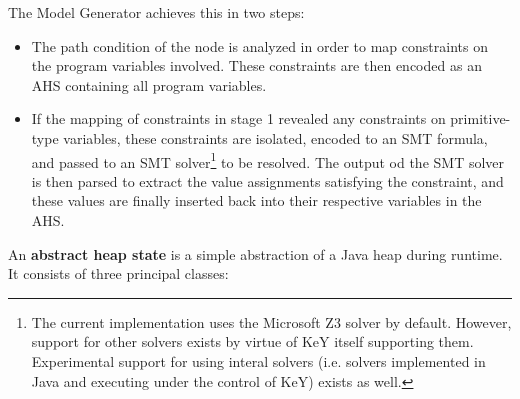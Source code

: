 \documentclass{article}
\newcommand{\tmstrong}[1]{\textbf{#1}}
\begin{document}
The Model Generator achieves this in two steps:
\begin{itemize}
  \item The path condition of the node is analyzed in order to map constraints
  on the program variables involved. These constraints are then encoded as an
  AHS containing all program variables.
  
  \item If the mapping of constraints in stage 1 revealed any constraints on
  primitive-type variables, these constraints are isolated, encoded to an SMT
  formula, and passed to an SMT solver{\footnote{The current implementation
  uses the Microsoft Z3 solver by default. However, support for other solvers
  exists by virtue of KeY itself supporting them. Experimental support for
  using interal solvers (i.e. solvers implemented in Java and executing under
  the control of KeY) exists as well.}} to be resolved. The output od the SMT
  solver is then parsed to extract the value assignments satisfying the
  constraint, and these values are finally inserted back into their respective
  variables in the AHS. \
  
  
\end{itemize}
An {\tmstrong{abstract heap state}} is a simple abstraction of a Java heap
during runtime. It consists of three principal classes:
\end{document}
